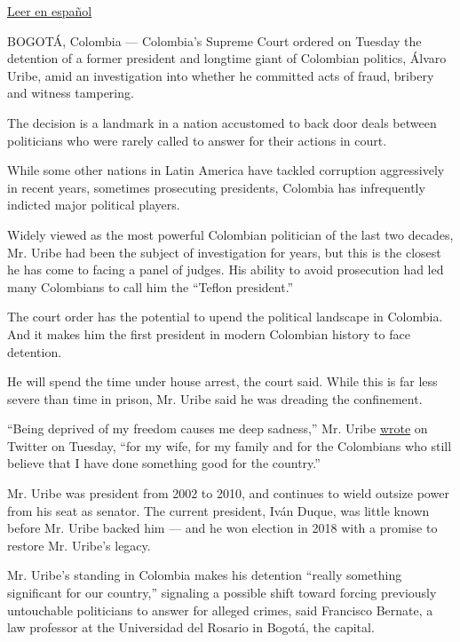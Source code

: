 \href{https://www.nytimes3xbfgragh.onion/es/2020/08/04/espanol/america-latina/alvaro-uribe-detencion-colombia.html}{Leer
en español}

BOGOTÁ, Colombia --- Colombia's Supreme Court ordered on Tuesday the
detention of a former president and longtime giant of Colombian
politics, Álvaro Uribe, amid an investigation into whether he committed
acts of fraud, bribery and witness tampering.

The decision is a landmark in a nation accustomed to back door deals
between politicians who were rarely called to answer for their actions
in court.

While some other nations in Latin America have tackled corruption
aggressively in recent years, sometimes prosecuting presidents, Colombia
has infrequently indicted major political players.

Widely viewed as the most powerful Colombian politician of the last two
decades, Mr. Uribe had been the subject of investigation for years, but
this is the closest he has come to facing a panel of judges. His ability
to avoid prosecution had led many Colombians to call him the ``Teflon
president.''

The court order has the potential to upend the political landscape in
Colombia. And it makes him the first president in modern Colombian
history to face detention.

He will spend the time under house arrest, the court said. While this is
far less severe than time in prison, Mr. Uribe said he was dreading the
confinement.

``Being deprived of my freedom causes me deep sadness,'' Mr. Uribe
\href{https://twitter.com/AlvaroUribeVel/status/1290712262504779784}{wrote}
on Twitter on Tuesday, ``for my wife, for my family and for the
Colombians who still believe that I have done something good for the
country.''

Mr. Uribe was president from 2002 to 2010, and continues to wield
outsize power from his seat as senator. The current president, Iván
Duque, was little known before Mr. Uribe backed him --- and he won
election in 2018 with a promise to restore Mr. Uribe's legacy.

Mr. Uribe's standing in Colombia makes his detention ``really something
significant for our country,'' signaling a possible shift toward forcing
previously untouchable politicians to answer for alleged crimes, said
Francisco Bernate, a law professor at the Universidad del Rosario in
Bogotá, the capital.

